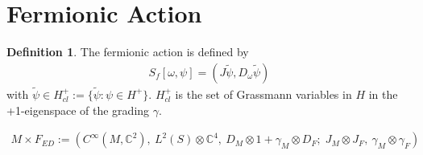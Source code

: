 \documentclass[a4paper]{article}
\theoremstyle{definition}
\newtheorem{definition}{Definition}
\theoremstyle{definition}
\theoremstyle{definition}
\theoremstyle{theorem}
\theoremstyle{theorem}
\theoremstyle{theorem}
\begin{document}
\section{Fermionic Action}
\begin{definition}
    The fermionic action is defined by
    \begin{align}
        S_f[\omega, \psi] = (J\tilde{\psi}, D_\omega \tilde{\psi})
    \end{align}
    with $\tilde{\psi} \in H_{cl}^+ := \{\tilde{\psi}: \psi \in H^+\}$.
    $H_{cl}^+$ is the set of Grassmann variables in $H$ in the +1-eigenspace
    of the grading $\gamma$.
\end{definition}

\begin{align}
    M\times F_{ED} := \left(C^\infty(M,\mathbb{C}^2),\ L^2(S)\otimes
    \mathbb{C}^4,\
    D_M\otimes 1 +\gamma _M \otimes D_F;\; J_M\otimes J_F,\ \gamma_M\otimes
    \gamma _F\right)
\end{align}
\end{document}
